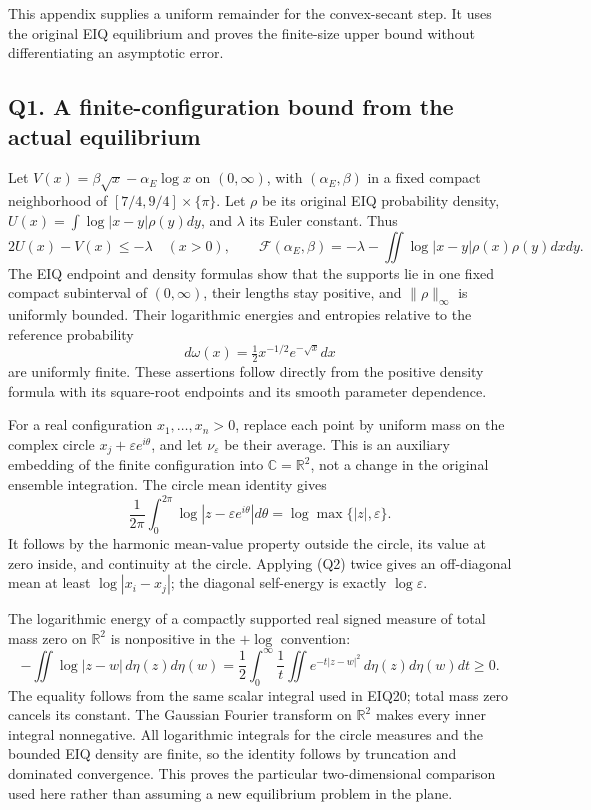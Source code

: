 \documentclass[
  11pt,
]{article}
\begin{document}
This appendix supplies a uniform remainder for the convex-secant step.
It uses the original EIQ equilibrium and proves the finite-size upper
bound without differentiating an asymptotic error.

\subsection{Q1. A finite-configuration bound from the actual
equilibrium}\label{q1.-a-finite-configuration-bound-from-the-actual-equilibrium}

Let \(V(x)=\beta\sqrt x-\alpha_E\log x\) on \((0,\infty)\), with
\((\alpha_E,\beta)\) in a fixed compact neighborhood of
\([7/4,9/4]\times\{\pi\}\). Let \(\rho\) be its original EIQ probability
density, \(U(x)=\int\log|x-y|\rho(y)dy\), and \(\lambda\) its Euler
constant. Thus \[
2U(x)-V(x)\le-\lambda\quad(x>0),\qquad
\mathcal F(\alpha_E,\beta)=-\lambda-\iint\log|x-y|\rho(x)\rho(y)dxdy.
\tag{Q1}
\] The EIQ endpoint and density formulas show that the supports lie in
one fixed compact subinterval of \((0,\infty)\), their lengths stay
positive, and \(\|\rho\|_\infty\) is uniformly bounded. Their
logarithmic energies and entropies relative to the reference probability
\[
d\omega(x)=\tfrac12x^{-1/2}e^{-\sqrt x}dx
\] are uniformly finite. These assertions follow directly from the
positive density formula with its square-root endpoints and its smooth
parameter dependence.

For a real configuration \(x_1,\ldots,x_n>0\), replace each point by
uniform mass on the complex circle \(x_j+\varepsilon e^{i\theta}\), and
let \(\nu_\varepsilon\) be their average. This is an auxiliary embedding
of the finite configuration into \(\mathbb C=\mathbb R^2\), not a change
in the original ensemble integration. The circle mean identity gives \[
\frac1{2\pi}\int_0^{2\pi}\log|z-\varepsilon e^{i\theta}|d\theta
=\log\max\{|z|,\varepsilon\}.
\tag{Q2}
\] It follows by the harmonic mean-value property outside the circle,
its value at zero inside, and continuity at the circle. Applying (Q2)
twice gives an off-diagonal mean at least \(\log|x_i-x_j|\); the
diagonal self-energy is exactly \(\log\varepsilon\).

The logarithmic energy of a compactly supported real signed measure of
total mass zero on \(\mathbb R^2\) is nonpositive in the \(+\log\)
convention: \[
-\iint\log|z-w|\,d\eta(z)d\eta(w)
=\frac12\int_0^\infty\frac1t\iint e^{-t|z-w|^2}\,d\eta(z)d\eta(w)dt\ge0.
\tag{Q3}
\] The equality follows from the same scalar integral used in EIQ20;
total mass zero cancels its constant. The Gaussian Fourier transform on
\(\mathbb R^2\) makes every inner integral nonnegative. All logarithmic
integrals for the circle measures and the bounded EIQ density are
finite, so the identity follows by truncation and dominated convergence.
This proves the particular two-dimensional comparison used here rather
than assuming a new equilibrium problem in the plane.
\end{document}

